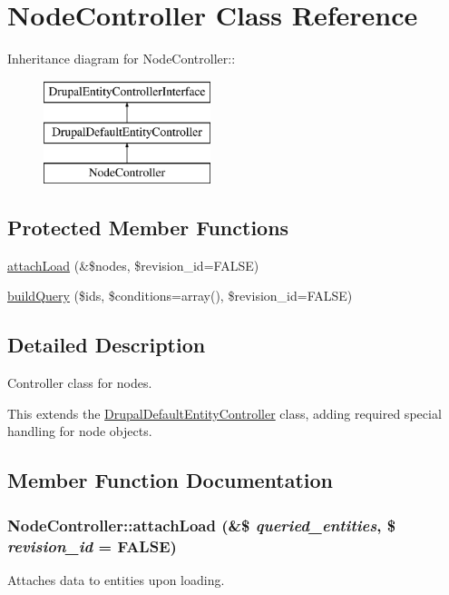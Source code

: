 \hypertarget{classNodeController}{
\section{NodeController Class Reference}
\label{classNodeController}
}
Inheritance diagram for NodeController::\begin{figure}[H]
\begin{center}
\leavevmode
\includegraphics[height=3cm]{classNodeController}
\end{center}
\end{figure}
\subsection*{Protected Member Functions}
\begin{DoxyCompactItemize}
\item 
\hyperlink{classNodeController_abdc7525854d61d63fa6ee79bb2409359}{attachLoad} (\&\$nodes, \$revision\_\-id=FALSE)
\item 
\hyperlink{classNodeController_a0326b94bee0719269dfd9f8ef93fbeb1}{buildQuery} (\$ids, \$conditions=array(), \$revision\_\-id=FALSE)
\end{DoxyCompactItemize}


\subsection{Detailed Description}
Controller class for nodes.

This extends the \hyperlink{classDrupalDefaultEntityController}{DrupalDefaultEntityController} class, adding required special handling for node objects. 

\subsection{Member Function Documentation}
\hypertarget{classNodeController_abdc7525854d61d63fa6ee79bb2409359}{
\subsubsection[{attachLoad}]{\setlength{\rightskip}{0pt plus 5cm}NodeController::attachLoad (\&\$ {\em queried\_\-entities}, \/  \$ {\em revision\_\-id} = {\ttfamily FALSE})}}
\label{classNodeController_abdc7525854d61d63fa6ee79bb2409359}
Attaches data to entities upon loading.

